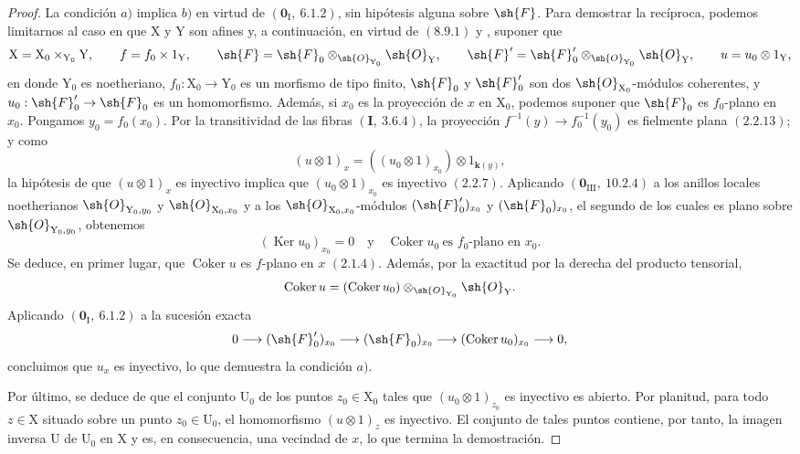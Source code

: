 \begin{proof}
La condición $a)$ implica $b)$ en virtud de $(\mathbf{0}_\mathrm{I},~6.1.2)$, sin hipótesis alguna sobre $\sh{F}$. Para demostrar la recíproca, podemos limitarnos al caso en que $\mathrm{X}$ y $\mathrm{Y}$ son afines y, a continuación, en virtud de $(8.9.1)$ y , suponer que
\[
  \mathrm{X}=\mathrm{X}_0\times_{\mathrm{Y}_0}\mathrm{Y},\qquad
  f=f_0\times 1_\mathrm{Y},\qquad
  \sh{F}=\sh{F}_0\otimes_{\sh{O}_{\mathrm{Y}_0}}\sh{O}_\mathrm{Y},\qquad
  \sh{F}'=\sh{F}'_0\otimes_{\sh{O}_{\mathrm{Y}_0}}\sh{O}_\mathrm{Y},\qquad
  u=u_0\otimes 1_\mathrm{Y},
\]
en donde $\mathrm{Y}_0$ es noetheriano, $f_0:\mathrm{X}_0\to\mathrm{Y}_0$ es un morfismo de tipo finito, $\sh{F}_0$ y $\sh{F}'_0$ son dos $\sh{O}_{\mathrm{X}_0}$-módulos coherentes, y $u_0:\sh{F}'_0\to\sh{F}_0$ es un homomorfismo. Además, si $x_0$ es la proyección de $x$ en $\mathrm{X}_0$, podemos suponer que $\sh{F}_0$ es $f_0$-plano en $x_0$. Pongamos $y_0=f_0(x_0)$. Por la transitividad de las fibras $(\mathbf{I},~3.6.4)$, la proyección $f^{-1}(y)\to f_0^{-1}(y_0)$ es fielmente plana $(2.2.13)$; y como
\[
  (u\otimes 1)_x=((u_0\otimes 1)_{x_0})\otimes 1_{\boldsymbol{k}(y)},
\]
la hipótesis de que $(u\otimes 1)_x$ es inyectivo implica que $(u_0\otimes 1)_{x_0}$ es inyectivo $(2.2.7)$. Aplicando $(\mathbf{0}_{\mathrm{III}},~10.2.4)$ a los anillos locales noetherianos $\sh{O}_{\mathrm{Y}_0,y_0}$ y $\sh{O}_{\mathrm{X}_0,x_0}$ y a los $\sh{O}_{\mathrm{X}_0,x_0}$-módulos $(\sh{F}'_0)_{x_0}$ y $(\sh{F}_0)_{x_0}$, el segundo de los cuales es plano sobre $\sh{O}_{\mathrm{Y}_0,y_0}$, obtenemos
\[
  (\operatorname{Ker}u_0)_{x_0}=0
  \quad\text{y}\quad
  \operatorname{Coker}u_0\ \text{es $f_0$-plano en }x_0.
\]
Se deduce, en primer lugar, que $\operatorname{Coker}u$ es $f$-plano en $x$ $(2.1.4)$. Además, por la exactitud por la derecha del producto tensorial,
\[
  \operatorname{Coker}u=(\operatorname{Coker}u_0)
  \otimes_{\sh{O}_{\mathrm{Y}_0}}\sh{O}_\mathrm{Y}.
\]
Aplicando $(\mathbf{0}_\mathrm{I},~6.1.2)$ a la sucesión exacta
\[
  0\longrightarrow(\sh{F}'_0)_{x_0}
  \longrightarrow(\sh{F}_0)_{x_0}
  \longrightarrow(\operatorname{Coker}u_0)_{x_0}
  \longrightarrow0,
\]
concluimos que $u_x$ es inyectivo, lo que demuestra la condición $a)$.

Por último, se deduce de  que el conjunto $\mathrm{U}_0$ de los puntos $z_0\in\mathrm{X}_0$ tales que $(u_0\otimes 1)_{z_0}$ es inyectivo es abierto. Por planitud, para todo $z\in\mathrm{X}$ situado sobre un punto $z_0\in\mathrm{U}_0$, el homomorfismo $(u\otimes 1)_z$ es inyectivo. El conjunto de tales puntos contiene, por tanto, la imagen inversa $\mathrm{U}$ de $\mathrm{U}_0$ en $\mathrm{X}$ y es, en consecuencia, una vecindad de $x$, lo que termina la demostración.
\end{proof}

